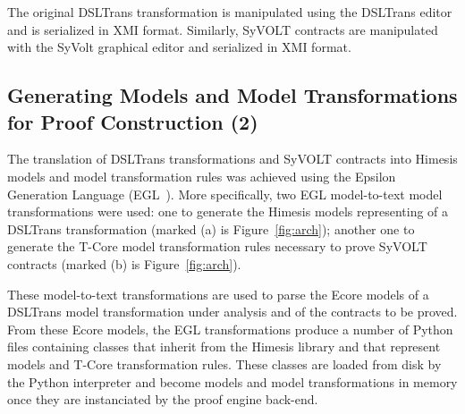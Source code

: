 The original DSLTrans transformation is manipulated using the DSLTrans editor
and is serialized in XMI format. Similarly, SyVOLT contracts are manipulated with the SyVolt graphical
editor and serialized in XMI format.


\subsection{Generating Models and Model Transformations for Proof Construction
(2)}
\label{sec:gen_models_mt}

The translation of DSLTrans transformations and SyVOLT contracts into Himesis
models and model transformation rules was achieved using the Epsilon Generation
Language (EGL~\cite{Rose2008}). More specifically, two EGL model-to-text model
transformations were used: one to generate the Himesis models
representing of a DSLTrans transformation (marked (a) is Figure~\ref{fig:arch});
another one to generate the T-Core model transformation rules necessary to prove
SyVOLT contracts (marked (b) is Figure~\ref{fig:arch}).

These model-to-text transformations are used to parse the Ecore models of a
DSLTrans model transformation under analysis and of the contracts to be proved.
From these Ecore models, the EGL transformations produce a number of Python
files containing classes that inherit from the Himesis library and that
represent models and T-Core transformation rules. These classes are loaded from
disk by the Python interpreter and become models and model transformations in
memory once they are instanciated by the proof engine back-end.



